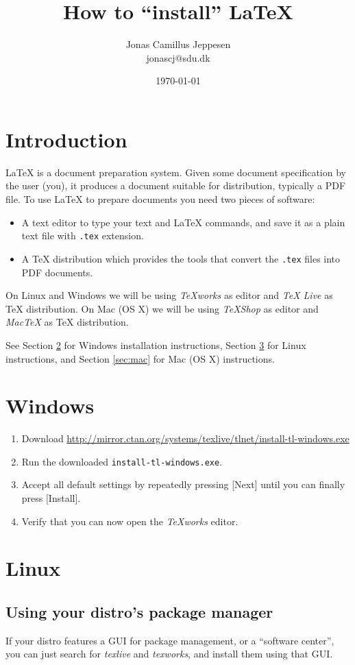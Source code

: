 \documentclass[a4paper, 12pt]{article}
\title{How to ``install'' \LaTeX}
\author{Jonas Camillus Jeppesen \\ 
	jonascj@sdu.dk\vspace{-15pt}}
\date{\today}
\begin{document}
\maketitle

\section{Introduction}
{\LaTeX} is a document preparation system. Given some document specification by the user (you), it produces a document suitable for distribution, typically a PDF file. To use {\LaTeX} to prepare documents you need two pieces of software:
\begin{itemize}
	\item A text editor to type your text and {\LaTeX} commands, and save it as a plain text file with \verb!.tex! extension.
	\item A {\TeX} distribution which provides the tools that convert the \verb!.tex! files into PDF documents.
\end{itemize} 
On Linux and Windows we will be using \emph{TeXworks} as editor and \emph{TeX Live} as {\TeX} distribution. On Mac (OS X) we will be using \emph{TeXShop} as editor and \emph{MacTeX} as {\TeX} distribution.

See Section \ref{sec:windows} for Windows installation instructions, Section \ref{sec:linux} for Linux instructions, and Section \ref{sec:mac} for Mac (OS X) instructions.

\section{Windows}
\label{sec:windows}
\begin{enumerate}
	\item Download \url{http://mirror.ctan.org/systems/texlive/tlnet/install-tl-windows.exe}
	\item Run the downloaded \verb!install-tl-windows.exe!.
	\item Accept all default settings by repeatedly pressing [Next] until you can finally press [Install].
	\item Verify that you can now open the \emph{TeXworks} editor.
\end{enumerate}

\section{Linux}
\label{sec:linux}
\subsection{Using your distro's package manager}
If your distro features a GUI for package management, or a ``software center'', you can just search for \emph{texlive} and \emph{texworks}, and install them using that GUI.
\end{document}
